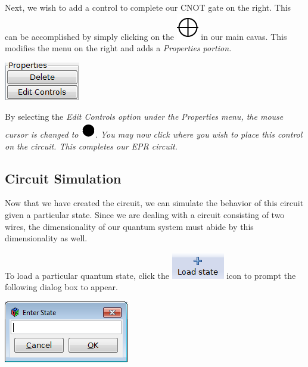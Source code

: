 \documentclass[10pt]{article}
\theoremstyle{definition}
\begin{document}
Next, we wish to add a control to complete our CNOT gate on the right. This can be accomplished by simply clicking on the \includegraphics[scale=0.60]{Figures/CreateCircuit/CNOT} in our main cavas. This modifies the menu on the right and adds a \em Properties \em portion. 

\begin{center}
\includegraphics{Figures/CreateCircuit/Properties.png}
\end{center}

By selecting the \em Edit Controls \em option under the \em Properties \em menu, the mouse cursor is changed to \includegraphics[scale=0.5]{Figures/CreateCircuit/Cursor.png}. You may now click where you wish to place this control on the circuit. This completes our EPR circuit. 

\subsection{Circuit Simulation}\label{sub:CircuitSimulation}
Now that we have created the circuit, we can simulate the behavior of this circuit given a particular state. Since we are dealing with a circuit consisting of two wires, the dimensionality of our quantum system must abide by this dimensionality as well.

To load a particular quantum state, click the \includegraphics[scale=0.60]{Figures/Navigation/LoadState.png} icon to prompt the following dialog box to appear.

\begin{center}
\includegraphics{Figures/CreateCircuit/LoadState.png}
\end{center}
\end{document}
